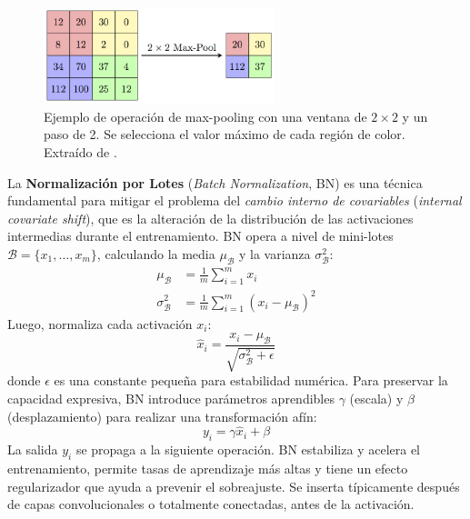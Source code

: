 \documentclass[11pt,spanish,listoffigures,listoftables]{tfgetsinf}
\begin{document}
\begin{figure}[H]
   \centering
   \includegraphics[width=0.6\textwidth]{images/estado_del_arte/max_pooling.png}
   \caption[Ejemplo de operación de max-pooling con una ventana de $2 \times 2$ y un paso de 2]{Ejemplo de operación de max-pooling con una ventana de $2 \times 2$ y un paso de 2. Se selecciona el valor máximo de cada región de color. Extraído de \cite{csWikiMaxpoolSample}.}
   \label{fig:pooling}
\end{figure}

La \textbf{Normalización por Lotes} (\textit{Batch Normalization}, BN) es una técnica fundamental para mitigar el problema del \textit{cambio interno de covariables} (\textit{internal covariate shift}), que es la alteración de la distribución de las activaciones intermedias durante el entrenamiento. BN opera a nivel de mini-lotes $\mathcal{B} = \{x_1, \dots, x_m\}$, calculando la media $\mu_{\mathcal{B}}$ y la varianza $\sigma^2_{\mathcal{B}}$:
\begin{align}
   \mu_{\mathcal{B}} &= \frac{1}{m} \sum_{i=1}^{m} x_i \\
   \sigma^2_{\mathcal{B}} &= \frac{1}{m} \sum_{i=1}^{m} (x_i - \mu_{\mathcal{B}})^2
\end{align}
Luego, normaliza cada activación $x_i$:
\begin{equation}
   \hat{x}_i = \frac{x_i - \mu_{\mathcal{B}}}{\sqrt{\sigma^2_{\mathcal{B}} + \epsilon}}
\end{equation}
donde $\epsilon$ es una constante pequeña para estabilidad numérica. Para preservar la capacidad expresiva, BN introduce parámetros aprendibles $\gamma$ (escala) y $\beta$ (desplazamiento) para realizar una transformación afín:
\begin{equation}
   y_i = \gamma \hat{x}_i + \beta
\end{equation}
La salida $y_i$ se propaga a la siguiente operación. BN estabiliza y acelera el entrenamiento, permite tasas de aprendizaje más altas y tiene un efecto regularizador que ayuda a prevenir el sobreajuste. Se inserta típicamente después de capas convolucionales o totalmente conectadas, antes de la activación.
\end{document}
